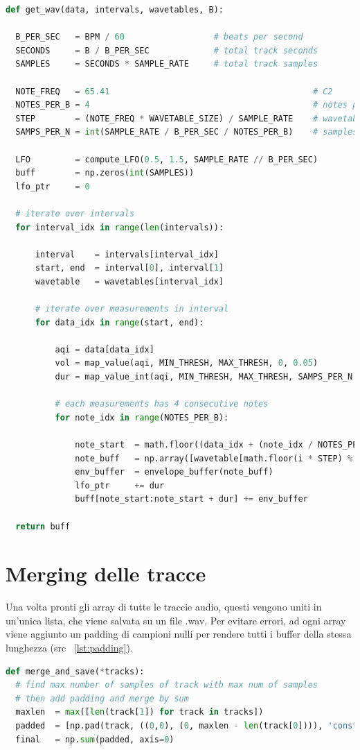 \label{lst:audio_buffer}
\begin{lstlisting}[language=Python]
def get_wav(data, intervals, wavetables, B):

  B_PER_SEC   = BPM / 60                  # beats per second
  SECONDS     = B / B_PER_SEC             # total track seconds
  SAMPLES     = SECONDS * SAMPLE_RATE     # total track samples

  NOTE_FREQ   = 65.41                                         # C2
  NOTES_PER_B = 4                                             # notes per beat
  STEP        = (NOTE_FREQ * WAVETABLE_SIZE) / SAMPLE_RATE    # wavetable step
  SAMPS_PER_N = int(SAMPLE_RATE / B_PER_SEC / NOTES_PER_B)    # samples per note

  LFO         = compute_LFO(0.5, 1.5, SAMPLE_RATE // B_PER_SEC)
  buff        = np.zeros(int(SAMPLES))
  lfo_ptr     = 0

  # iterate over intervals
  for interval_idx in range(len(intervals)):

      interval    = intervals[interval_idx]
      start, end  = interval[0], interval[1]
      wavetable   = wavetables[interval_idx]

      # iterate over measurements in interval
      for data_idx in range(start, end):

          aqi = data[data_idx]
          vol = map_value(aqi, MIN_THRESH, MAX_THRESH, 0, 0.05)
          dur = map_value_int(aqi, MIN_THRESH, MAX_THRESH, SAMPS_PER_N // 4, SAMPS_PER_N)

          # each measurements has 4 consecutive notes
          for note_idx in range(NOTES_PER_B):

              note_start  = math.floor((data_idx + (note_idx / NOTES_PER_B)) * (SAMPLE_RATE / B_PER_SEC))
              note_buff   = np.array([wavetable[math.floor(i * STEP) % WAVETABLE_SIZE] * vol * LFO(i + lfo_ptr) for i in range(dur)])
              env_buffer  = envelope_buffer(note_buff)
              lfo_ptr     += dur
              buff[note_start:note_start + dur] += env_buffer

  return buff
\end{lstlisting}

\section{Merging delle tracce}
Una volta pronti gli array di tutte le traccie audio, questi vengono uniti in un'unica lista, che viene salvata su un file .wav.
Per evitare errori, ad ogni array viene aggiunto un padding di campioni nulli per rendere tutti i buffer della stessa lunghezza (src ~\ref{lst:padding}).
\label{lst:padding}
\begin{lstlisting}[language=Python]
def merge_and_save(*tracks):
  # find max number of samples of track with max num of samples
  # then add padding and merge by sum
  maxlen  = max([len(track[1]) for track in tracks])
  padded  = [np.pad(track, ((0,0), (0, maxlen - len(track[0]))), 'constant', constant_values=0) for track in tracks]
  final   = np.sum(padded, axis=0)
\end{lstlisting}



